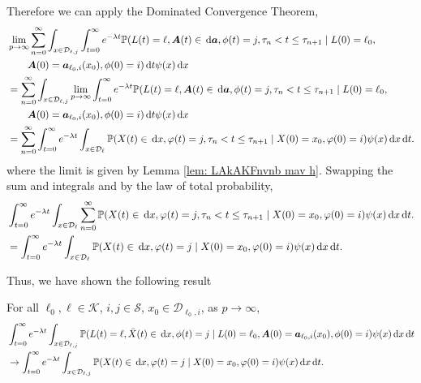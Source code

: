 Therefore we can apply the Dominated Convergence Theorem, 
\begin{align}
	&\lim_{p\to\infty} \sum_{n=0}^\infty\int_{x\in\mathcal D_{\ell,j}}\int_{t=0}^\infty e^{-\lambda t} \mathbb P(L(t) = \ell, \boldsymbol A(t) \in \, \mathrm{d} \boldsymbol a, \phi(t) = j, \tau_{n}< t \leq\tau_{n+1} \mid L(0)=\ell_0, \nonumber
	\\&\qquad{}\boldsymbol A(0)=\boldsymbol  a_{\ell_0,i}(x_0), \phi(0)=i)\, \mathrm{d} t \psi(x) \, \mathrm{d} x \nonumber
	\\&= \sum_{n=0}^\infty\int_{x\in\mathcal D_{\ell,j}}\lim_{p\to\infty} \int_{t=0}^\infty e^{-\lambda t} \mathbb P(L(t) = \ell, \boldsymbol A(t) \in \, \mathrm{d} \boldsymbol a, \phi(t) = j, \tau_{n}< t \leq\tau_{n+1} \mid L(0)=\ell_0, \nonumber
	\\&\qquad{}\boldsymbol A(0)=\boldsymbol  a_{\ell_0,i}(x_0), \phi(0)=i)\, \mathrm{d} t \psi(x) \, \mathrm{d} x \nonumber
	\\&= \sum_{n=0}^\infty\int_{t=0}^\infty e^{-\lambda t}  \int_{x\in\mathcal{D}_\ell}\mathbb P(X(t)\in\, \mathrm{d} x, \varphi(t)=j, \tau_n < t \leq \tau_{n+1}  
	\mid X(0)=x_0, \varphi(0)=i)\psi(x)\, \mathrm{d} x\, \mathrm{d} t. \nonumber
\end{align}
where the limit is given by Lemma \ref{lem: LAkAKFnvnb mav h}. Swapping the sum and integrals and by the law of total probability, 
\begin{align}
	& \int_{t=0}^\infty e^{-\lambda t}  \int_{x\in\mathcal{D}_\ell}\sum_{n=0}^\infty\mathbb P(X(t)\in\, \mathrm{d} x, \varphi(t)=j, \tau_n < t \leq \tau_{n+1}  
	\mid X(0)=x_0, \varphi(0)=i)\psi(x)\, \mathrm{d} x\, \mathrm{d} t. \nonumber
	\\&= \int_{t=0}^\infty e^{-\lambda t}  \int_{x\in\mathcal{D}_\ell} \mathbb P(X(t)\in\, \mathrm{d} x, \varphi(t)=j  
	\mid X(0)=x_0, \varphi(0)=i)\psi(x)\, \mathrm{d} x\, \mathrm{d} t. \nonumber
\end{align}

Thus, we have shown the following result
\begin{lem}\label{lem: KajPOw}
	For all \(\ell_0,\ell\in\mathcal K\), \(i,j\in\mathcal S\), \(x_0\in\mathcal D_{\ell_0,i}\), as \(p\to\infty\), 
	\begin{align}
		&\int_{t=0}^\infty e^{-\lambda t}\int_{x\in\mathcal D_{\ell,j}}\mathbb P(L(t) = \ell, \bar X(t) \in \, \mathrm{d} x, \phi(t) = j \mid L(0)=\ell_0, \boldsymbol A(0)=\boldsymbol  a_{\ell_0,i}(x_0), \phi(0)=i)\psi(x)\, \mathrm{d} x\, \mathrm{d} t \nonumber
		\\&\to \int_{t=0}^\infty e^{-\lambda t}  \int_{x\in\mathcal{D}_{\ell,j}} \mathbb P(X(t)\in\, \mathrm{d} x, \varphi(t)=j  
		\mid X(0)=x_0, \varphi(0)=i)\psi(x)\, \mathrm{d} x\, \mathrm{d} t. \nonumber
	\end{align}
\end{lem}

